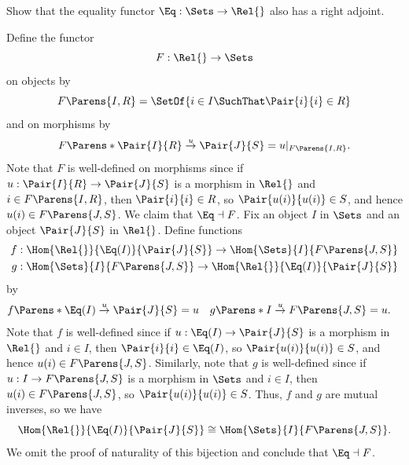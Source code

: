 \begin{exercise}
Show that the equality functor \(\Eq : \Sets \to \Rel{}\) also has a right adjoint.
\end{exercise}

\begin{solution}
Define the functor
\begin{equation*}
F : \Rel{} \to \Sets
\end{equation*}
on objects by
\begin{equation*}
F\Parens{I, R} = \SetOf{i \in I \SuchThat \Pair{i}{i} \in R}
\end{equation*}
and on morphisms by
\begin{equation*}
F\Parens*{\Pair{I}{R} \overset{u}{\to} \Pair{J}{S}}
= u|_{F\Parens{I, R}}.
\end{equation*}
Note that \(F\) is well-defined on morphisms since if \(u : \Pair{I}{R} \to \Pair{J}{S}\) is a morphism in \(\Rel{}\) and \(i \in F\Parens{I, R}\), then \(\Pair{i}{i} \in R\), so \(\Pair{u(i)}{u(i)} \in S\), and hence \(u(i) \in F\Parens{J, S}\).
We claim that \(\Eq \dashv F\).
Fix an object \(I\) in \(\Sets\) and an object \(\Pair{J}{S}\) in \(\Rel{}\).
Define functions
\begin{align*}
f &: \Hom{\Rel{}}{\Eq(I)}{\Pair{J}{S}} \to \Hom{\Sets}{I}{F\Parens{J, S}} \\
g &: \Hom{\Sets}{I}{F\Parens{J, S}} \to \Hom{\Rel{}}{\Eq(I)}{\Pair{J}{S}}
\end{align*}
by
\begin{align*}
f\Parens*{\Eq(I) \overset{u}{\to} \Pair{J}{S}}
&= u &
g\Parens*{I \overset{u}{\to} F\Parens{J, S}}
&= u.
\end{align*}
Note that \(f\) is well-defined since if \(u : \Eq(I) \to \Pair{J}{S}\) is a morphism in \(\Rel{}\) and \(i \in I\), then \(\Pair{i}{i} \in \Eq(I)\), so \(\Pair{u(i)}{u(i)} \in S\), and hence \(u(i) \in F\Parens{J, S}\).
Similarly, note that \(g\) is well-defined since if \(u : I \to F\Parens{J, S}\) is a morphism in \(\Sets\) and \(i \in I\), then \(u(i) \in F\Parens{J, S}\), so \(\Pair{u(i)}{u(i)} \in S\).
Thus, \(f\) and \(g\) are mutual inverses, so we have
\begin{equation*}
\Hom{\Rel{}}{\Eq(I)}{\Pair{J}{S}} \cong \Hom{\Sets}{I}{F\Parens{J, S}}.
\end{equation*}
We omit the proof of naturality of this bijection and conclude that \(\Eq \dashv F\).
\end{solution}